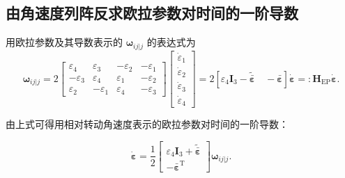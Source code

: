 \subsection{由角速度列阵反求欧拉参数对时间的一阶导数}
用欧拉参数及其导数表示的 $\boldsymbol{\omega}_{ij|j}$ 的表达式为
\[
\boldsymbol{\omega}_{ij|j}=2
\begin{bmatrix}
\varepsilon_4 & \varepsilon_3 & -\varepsilon_2 & -\varepsilon_1\\
-\varepsilon_3 & \varepsilon_4 & \varepsilon_1 & -\varepsilon_2\\
\varepsilon_2 & -\varepsilon_1 & \varepsilon_4 & -\varepsilon_3
\end{bmatrix}
\begin{bmatrix}
\dot{\varepsilon}_1\\ \dot{\varepsilon}_2\\ \dot{\varepsilon}_3\\ \dot{\varepsilon}_4
\end{bmatrix}
=2\left[\varepsilon_4\boldsymbol{I}_3-\tilde{\bar{\boldsymbol{\varepsilon}}}\quad -\bar{\boldsymbol{\varepsilon}}\right]\dot{\boldsymbol{\varepsilon}}
=:\boldsymbol{H}_{\mathrm{EP}}\dot{\boldsymbol{\varepsilon}}.
\]
\begin{theorem}[由角速度反求欧拉参数导数]
由上式可得用相对转动角速度表示的欧拉参数对时间的一阶导数：

\[
\dot{\boldsymbol{\varepsilon}}=\frac{1}{2}
\begin{bmatrix}
\varepsilon_4\boldsymbol{I}_3+\tilde{\bar{\boldsymbol{\varepsilon}}}\\
-\bar{\boldsymbol{\varepsilon}}^{\mathrm{T}}
\end{bmatrix}
\boldsymbol{\omega}_{ij|j}.
\]
\end{theorem}
